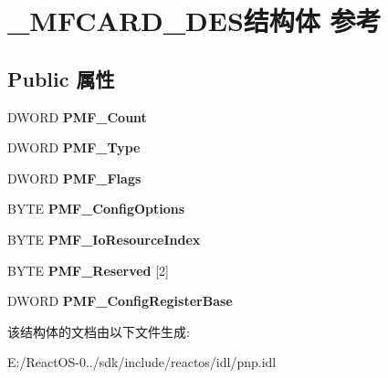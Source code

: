 \hypertarget{struct___m_f_c_a_r_d___d_e_s}{}\section{\+\_\+\+M\+F\+C\+A\+R\+D\+\_\+\+D\+E\+S结构体 参考}
\label{struct___m_f_c_a_r_d___d_e_s}
\subsection*{Public 属性}
\begin{DoxyCompactItemize}
\item 
\mbox{\label{struct___m_f_c_a_r_d___d_e_s_a1794a6ba2374352f4fcde0826fa405ba}} 
D\+W\+O\+RD {\bfseries P\+M\+F\+\_\+\+Count}
\item 
\mbox{\label{struct___m_f_c_a_r_d___d_e_s_a81a92b410d6559f42d8cb5d347abd54a}} 
D\+W\+O\+RD {\bfseries P\+M\+F\+\_\+\+Type}
\item 
\mbox{\label{struct___m_f_c_a_r_d___d_e_s_a128c761dcd5058460022618dd21ff063}} 
D\+W\+O\+RD {\bfseries P\+M\+F\+\_\+\+Flags}
\item 
\mbox{\label{struct___m_f_c_a_r_d___d_e_s_a9fa51ff5a93ef45560ba9367c5bbd1af}} 
B\+Y\+TE {\bfseries P\+M\+F\+\_\+\+Config\+Options}
\item 
\mbox{\label{struct___m_f_c_a_r_d___d_e_s_a676304804a7640c8e88d385a0496823c}} 
B\+Y\+TE {\bfseries P\+M\+F\+\_\+\+Io\+Resource\+Index}
\item 
\mbox{\label{struct___m_f_c_a_r_d___d_e_s_af814f5f22d84d9fe11f070ec5a22729c}} 
B\+Y\+TE {\bfseries P\+M\+F\+\_\+\+Reserved} \mbox{[}2\mbox{]}
\item 
\mbox{\label{struct___m_f_c_a_r_d___d_e_s_ac16a3e6048cdacc09aecace00199c973}} 
D\+W\+O\+RD {\bfseries P\+M\+F\+\_\+\+Config\+Register\+Base}
\end{DoxyCompactItemize}


该结构体的文档由以下文件生成\+:\begin{DoxyCompactItemize}
\item 
E\+:/\+React\+O\+S-\/0../sdk/include/reactos/idl/pnp.\+idl\end{DoxyCompactItemize}
